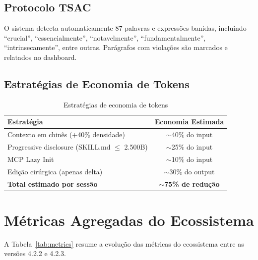 \documentclass[12pt,a4paper]{article}
\begin{document}
\subsection{Protocolo TSAC}

O sistema detecta automaticamente 87 palavras e expressões banidas, incluindo ``crucial'', ``essencialmente'', ``notavelmente'', ``fundamentalmente'', ``intrinsecamente'', entre outras. Parágrafos com violações são marcados e relatados no dashboard.

\subsection{Estratégias de Economia de Tokens}

\begin{table}[H]
  \centering
  \caption{Estratégias de economia de tokens}
  \label{tab:tokens}
  \begin{tabular}{l c}
    \toprule
    \textbf{Estratégia} & \textbf{Economia Estimada} \\
    \midrule
    Contexto em chinês (+40\% densidade)          & $\sim$40\% do input \\
    Progressive disclosure (SKILL.md $\leq$ 2.500B) & $\sim$25\% do input \\
    MCP Lazy Init                                  & $\sim$10\% do input \\
    Edição cirúrgica (apenas delta)                & $\sim$30\% do output \\
    \textbf{Total estimado por sessão}             & \textbf{$\sim$75\% de redução} \\
    \bottomrule
  \end{tabular}
\end{table}

\section{Métricas Agregadas do Ecossistema}

A Tabela~\ref{tab:metrics} resume a evolução das métricas do ecossistema entre as versões 4.2.2 e 4.2.3.
\end{document}
